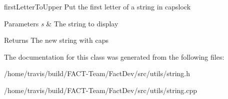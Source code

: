 first\-Letter\-To\-Upper Put the first letter of a string in capslock 


\begin{DoxyParams}{Parameters}
{\em s} & The string to display \\
\hline
\end{DoxyParams}
\begin{DoxyReturn}{Returns}
The new string with caps 
\end{DoxyReturn}


The documentation for this class was generated from the following files\-:\begin{DoxyCompactItemize}
\item 
/home/travis/build/\-F\-A\-C\-T-\/\-Team/\-Fact\-Dev/src/utils/string.\-h\item 
/home/travis/build/\-F\-A\-C\-T-\/\-Team/\-Fact\-Dev/src/utils/string.\-cpp\end{DoxyCompactItemize}
